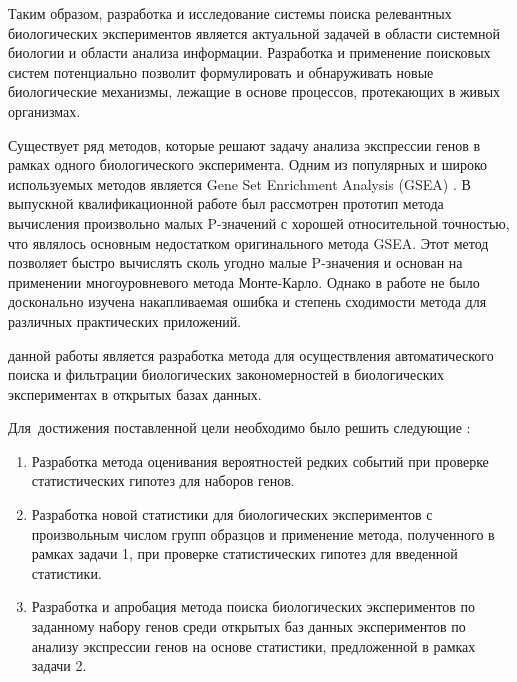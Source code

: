 Таким образом, разработка и исследование системы поиска релевантных биологических экспериментов является актуальной задачей в области системной биологии и области анализа информации. 
Разработка и применение поисковых систем потенциально позволит формулировать и обнаруживать новые биологические механизмы, лежащие в основе процессов, протекающих в живых организмах.




{\progress} Существует ряд методов, которые решают задачу анализа экспрессии генов в рамках одного биологического эксперимента.
Одним из популярных и широко используемых методов является Gene Set Enrichment Analysis (GSEA) \cite{subramanian2005gene}.
В выпускной квалификационной работе \cite{KorotkevichVKR} был рассмотрен прототип метода вычисления произвольно малых P-значений с хорошей относительной точностью, что являлось основным недостатком оригинального метода GSEA.
Этот метод позволяет быстро вычислять сколь угодно малые P-значения и основан на применении многоуровневого метода Монте-Карло.
Однако в работе не было досконально изучена накапливаемая ошибка и степень сходимости метода для различных практических приложений.

{\aim} данной работы является разработка метода для осуществления автоматического поиска и фильтрации биологических закономерностей в биологических экспериментах в открытых базах данных.

Для~достижения поставленной цели необходимо было решить следующие {\tasks}:
\begin{enumerate}[beginpenalty=10000] %
  \item Разработка метода  оценивания вероятностей редких событий при проверке статистических гипотез для наборов генов.
  \item Разработка новой статистики для биологических экспериментов с произвольным числом групп образцов и применение метода, полученного в рамках задачи 1, при проверке статистических гипотез для введенной статистики.
  \item Разработка и апробация метода поиска биологических экспериментов по заданному набору генов среди открытых баз данных экспериментов по анализу экспрессии генов на основе статистики, предложенной в рамках задачи 2.
\end{enumerate}


